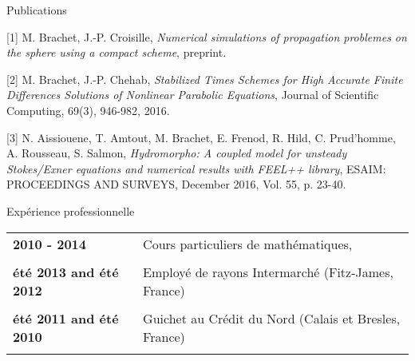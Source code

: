 \documentclass[10pt,a4paper]{report}
\begin{document}
\vspace{.5cm}
\newpage
\noindent
{\selectfont
\begin{Large}
Publications
\end{Large}
\hrulefill
}
\vspace{0.5cm}

[1] {\sc  M. Brachet, J.-P. Croisille}, {\sl Numerical simulations of propagation problemes on the sphere using a compact scheme}, preprint.

\vspace{0.6cm}

[2] {\sc M. Brachet, J.-P. Chehab}, {\sl Stabilized Times Schemes for High Accurate Finite Differences Solutions of Nonlinear Parabolic Equations}, Journal of Scientific Computing, 69(3), 946-982, 2016.

\vspace{0.6cm}

[3] {\sc  N. Aissiouene, T. Amtout, M. Brachet, E. Frenod, R. Hild, C. Prud'homme, A. Rousseau, S. Salmon}, {\sl  Hydromorpho: A coupled model for unsteady Stokes/Exner equations and numerical results with FEEL++ library}, ESAIM: PROCEEDINGS AND SURVEYS, December 2016, Vol. 55, p. 23-40.






\vspace{.5cm}
\noindent
{\selectfont
\begin{Large}
Expérience professionnelle
\end{Large}
\hrulefill
}

\noindent
\begin{center}
\begin{tabular}{p{5cm} p{10cm}}
\textbf{2010 - 2014} & Cours particuliers de mathématiques,\\

& \\

\textbf{été 2013 and été 2012} & Employé de rayons Intermarché (Fitz-James, France) \\

& \\

\textbf{été 2011 and été 2010} & Guichet au Crédit du Nord (Calais et Bresles, France) \\

& \\

\end{tabular}
\end{center}
\end{document}
